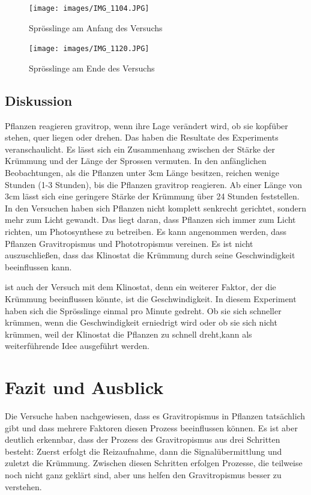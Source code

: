 \documentclass[
11pt, 
ngerman,
listof=totocnumbered,
oneside,
bibliography=totocnumbered,
abstracton
]{scrreprt}
\begin{document}
\begin{figure}[H]
	\centering 
	\texttt{[image: images/IMG\_1104.JPG]}
	\caption{Sprösslinge am Anfang des Versuchs \label{Foto 6}}
\end{figure} 

\begin{figure}[H]
	\centering 
	\texttt{[image: images/IMG\_1120.JPG]}
	\caption{Sprösslinge am Ende des Versuchs \label{Foto 7}}
\end{figure} 


\section{Diskussion}

Pflanzen reagieren gravitrop, wenn ihre Lage verändert wird, ob sie kopfüber stehen, quer liegen oder drehen. Das haben die Resultate des Experiments  veranschaulicht. Es lässt sich ein Zusammenhang zwischen der Stärke der Krümmung und der Länge der Sprossen vermuten. In den anfänglichen Beobachtungen, als die Pflanzen unter 3cm Länge besitzen, reichen wenige Stunden (1-3 Stunden), bis die Pflanzen gravitrop reagieren. Ab einer Länge von 3cm lässt sich eine geringere Stärke der Krümmung über 24 Stunden feststellen.
In den Versuchen haben sich Pflanzen nicht komplett senkrecht gerichtet, sondern mehr zum Licht gewandt. Das liegt daran, dass Pflanzen sich immer zum Licht richten, um Photosynthese zu betreiben. Es kann angenommen werden, dass Pflanzen Gravitropismus und Phototropismus vereinen.
Es ist nicht auszuschließen, dass das Klinostat die Krümmung durch seine Geschwindigkeit beeinflussen kann.

  ist auch der Versuch mit dem Klinostat, denn ein weiterer Faktor, der die Krümmung beeinflussen könnte, ist die Geschwindigkeit. In diesem Experiment haben sich die Sprösslinge einmal pro Minute gedreht. Ob sie sich schneller krümmen, wenn die Geschwindigkeit erniedrigt wird oder ob sie sich nicht krümmen, weil der Klinostat die Pflanzen zu schnell dreht,kann als weiterführende Idee ausgeführt werden.


\chapter{Fazit und Ausblick}

Die Versuche haben nachgewiesen, dass es Gravitropismus in Pflanzen tatsächlich gibt und dass mehrere Faktoren diesen Prozess beeinflussen können. Es ist aber deutlich erkennbar, dass der Prozess des Gravitropismus aus drei Schritten besteht: Zuerst erfolgt die Reizaufnahme, dann die Signalübermittlung und zuletzt die Krümmung. Zwischen diesen Schritten erfolgen Prozesse, die teilweise noch nicht ganz geklärt sind, aber uns helfen den Gravitropismus besser zu verstehen. 
\end{document}

